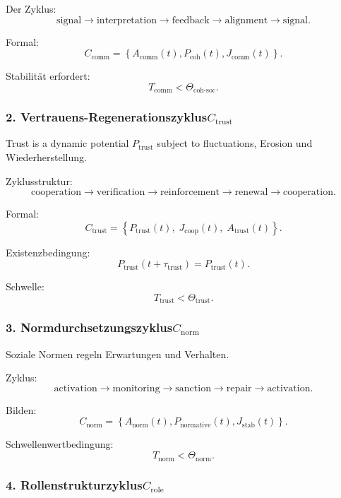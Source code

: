 Der Zyklus:
\[
  \mathrm{signal}
  \to
  \mathrm{interpretation}
  \to
  \mathrm{feedback}
  \to
  \mathrm{alignment}
  \to
  \mathrm{signal}.
\]

Formal:
\[
  C_{\mathrm{comm}}
    =
    \left\{
      A_{\mathrm{comm}}(t),
      P_{\mathrm{coh}}(t),
      J_{\mathrm{comm}}(t)
    \right\}.
\]

Stabilität erfordert:
\[
  T_{\mathrm{comm}} < \Theta_{\mathrm{coh\text{-}soc}}.
\]

\subsubsection{2. Vertrauens-Regenerationszyklus$C_{\mathrm{trust}}$}

Trust is a dynamic potential $P_{\mathrm{trust}}$ subject to fluctuations,
Erosion und Wiederherstellung.

Zyklusstruktur:
\[
  \mathrm{cooperation}
  \to
  \mathrm{verification}
  \to
  \mathrm{reinforcement}
  \to
  \mathrm{renewal}
  \to
  \mathrm{cooperation}.
\]

Formal:
\[
 C_{\mathrm{trust}}
   =
   \left\{
     P_{\mathrm{trust}}(t),\;
     J_{\mathrm{coop}}(t),\;
     A_{\mathrm{trust}}(t)
   \right\}.
\]

Existenzbedingung:
\[
  P_{\mathrm{trust}}(t+\tau_{\mathrm{trust}})=
  P_{\mathrm{trust}}(t).
\]

Schwelle:
\[
  T_{\mathrm{trust}} < \Theta_{\mathrm{trust}}.
\]

\subsubsection{3. Normdurchsetzungszyklus$C_{\mathrm{norm}}$}

Soziale Normen regeln Erwartungen und Verhalten.

Zyklus:
\[
  \mathrm{activation}
  \to
  \mathrm{monitoring}
  \to
  \mathrm{sanction}
  \to
  \mathrm{repair}
  \to
  \mathrm{activation}.
\]

Bilden:
\[
  C_{\mathrm{norm}}=
  \left\{
    A_{\mathrm{norm}}(t),
    P_{\mathrm{normative}}(t),
    J_{\mathrm{stab}}(t)
  \right\}.
\]

Schwellenwertbedingung:
\[
  T_{\mathrm{norm}} < \Theta_{\mathrm{norm}}.
\]

\subsubsection{4. Rollenstrukturzyklus$C_{\mathrm{role}}$}

